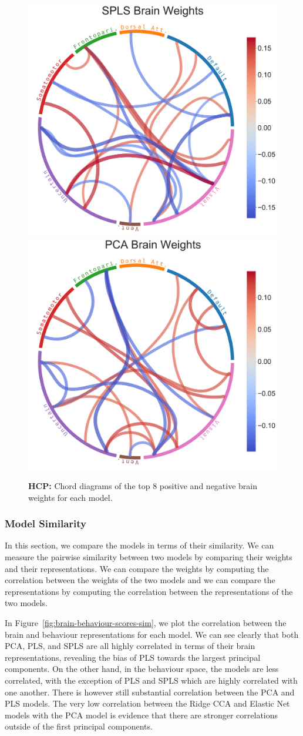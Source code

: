 \begin{figure}[h]
    \includegraphics[width=0.49\linewidth]{figures/hcp/SPLS brain weights}
    \includegraphics[width=0.49\linewidth]{figures/hcp/PCA brain weights}
    \caption{\textbf{HCP:} Chord diagrams of the top 8 positive and negative brain \gls{weights} for each model.}\label{fig:chord_weights}
\end{figure}

\subsubsection{Model Similarity}

In this section, we compare the models in terms of their similarity.
We can measure the pairwise similarity between two models by comparing their \gls{weights} and their \gls{representations}.
We can compare the \gls{weights} by computing the correlation between the \gls{weights} of the two models and we can compare the \gls{representations} by computing the correlation between the \gls{representations} of the two models.

In Figure~\ref{fig:brain-behaviour-scores-sim}, we plot the correlation between the brain and behaviour \gls{representations} for each model. 
We can see clearly that both PCA, PLS, and SPLS are all highly correlated in terms of their brain representations, revealing the bias of PLS towards the largest principal components.
On the other hand, in the behaviour space, the models are less correlated, with the exception of PLS and SPLS which are highly correlated with one another. 
There is however still substantial correlation between the PCA and PLS models.
The very low correlation between the Ridge CCA and Elastic Net models with the PCA model is evidence that there are stronger correlations outside of the first principal components.

